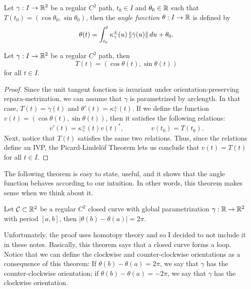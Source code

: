 \begin{definition}
    Let $\gamma : I \to \mathbb{R}^2$ be a regular $C^2$ path, $t_0 \in I$ and $\theta_0 \in \mathbb{R}$ such that $T(t_0) = (\cos \theta_0, \sin \theta_0)$, then the \textit{angle function} $\theta : I \to \mathbb{R}$ is defined by
    $$\theta(t) = \int_{t_0}^{t}\kappa_{\gamma}^{\pm}(u)\left\lVert\dot{\gamma}(u) \right\rVert du + \theta_0.$$
\end{definition}

\begin{proposition}
    Let $\gamma : I \to \mathbb{R}^2$ be a regular $C^2$ path, then
    $$T(t) = (\cos \theta(t), \sin \theta(t))$$
    for all $t \in I$.
\end{proposition}

\begin{proof}
    Since the unit tangent fonction is invariant under orientation-preserving repara-metrization, we can assume that $\gamma$ is parametrized by arclength. In that case, $T(t) = \dot{\gamma}(t)$ and $\theta'(t) = \kappa_{\gamma}^{\pm}(t)$. If we define the function $v(t) = (\cos \theta(t), \sin \theta(t))$, then it satisfies the following relations:
    $$v'(t) = \kappa_{\gamma}^{\pm}(t)v(t)^*, \qquad \qquad v(t_0) = T(t_0).$$
    Next, notice that $T(t)$ satisfies the same two relations. Thus, since the relations define an IVP, the Picard-Lindelöf Theorem lets us conclude that $v(t) = T(t)$ for all $t \in I$.
\end{proof}

The following theorem is easy to state, useful, and it shows that the angle function behaves according to our intuition. In other words, this theorem makes sense when we think about it.

\begin{theorem}
    Let $\mathcal{C} \subset \mathbb{R}^2$ be a regular $C^2$ closed curve with global parametrization $\gamma : \mathbb{R} \to \mathbb{R}^2$ with period $[a,b]$, then $|\theta(b) - \theta(a)| = 2\pi$.
\end{theorem}

Unfortunately, the proof uses homotopy theory and so I decided to not include it in these notes. Basically, this theorem says that a closed curve forms a loop. Notice that we can define the clockwise and counter-clockwise orientations as a consequence of this theorem: If $\theta(b) - \theta(a) = 2\pi$, we say that $\gamma$ has the counter-clockwise orientation; if $\theta(b) - \theta(a) = -2\pi$, we say that $\gamma$ has the clockwise orientation.\\

